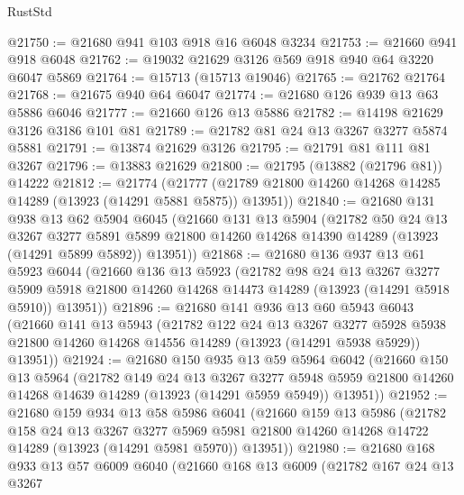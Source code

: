 \begin{lexlean}{RustStd}
\begin{coremodule}
@21750 := @21680 @941 @103 @918 @16 @6048 @3234
@21753 := @21660 @941 @918 @6048
@21762 := @19032 @21629 @3126 @569 @918 @940 @64 @3220 @6047 @5869
@21764 := @15713 (@15713 @19046)
@21765 := @21762 @21764
@21768 := @21675 @940 @64 @6047
@21774 := @21680 @126 @939 @13 @63 @5886 @6046
@21777 := @21660 @126 @13 @5886
@21782 := @14198 @21629 @3126 @3186 @101 @81
@21789 := @21782 @81 @24 @13 @3267 @3277 @5874 @5881
@21791 := @13874 @21629 @3126
@21795 := @21791 @81 @111 @81 @3267
@21796 := @13883 @21629
@21800 := @21795 (@13882 (@21796 @81)) @14222
@21812 := @21774
    (@21777 (@21789 @21800 @14260 @14268 @14285 @14289 (@13923 (@14291 @5881 @5875)) @13951))
@21840 := @21680
    @131
    @938
    @13
    @62
    @5904
    @6045
    (@21660
      @131
      @13
      @5904
      (@21782
        @50
        @24
        @13
        @3267
        @3277
        @5891
        @5899
        @21800
        @14260
        @14268
        @14390
        @14289
        (@13923 (@14291 @5899 @5892))
        @13951))
@21868 := @21680
    @136
    @937
    @13
    @61
    @5923
    @6044
    (@21660
      @136
      @13
      @5923
      (@21782
        @98
        @24
        @13
        @3267
        @3277
        @5909
        @5918
        @21800
        @14260
        @14268
        @14473
        @14289
        (@13923 (@14291 @5918 @5910))
        @13951))
@21896 := @21680
    @141
    @936
    @13
    @60
    @5943
    @6043
    (@21660
      @141
      @13
      @5943
      (@21782
        @122
        @24
        @13
        @3267
        @3277
        @5928
        @5938
        @21800
        @14260
        @14268
        @14556
        @14289
        (@13923 (@14291 @5938 @5929))
        @13951))
@21924 := @21680
    @150
    @935
    @13
    @59
    @5964
    @6042
    (@21660
      @150
      @13
      @5964
      (@21782
        @149
        @24
        @13
        @3267
        @3277
        @5948
        @5959
        @21800
        @14260
        @14268
        @14639
        @14289
        (@13923 (@14291 @5959 @5949))
        @13951))
@21952 := @21680
    @159
    @934
    @13
    @58
    @5986
    @6041
    (@21660
      @159
      @13
      @5986
      (@21782
        @158
        @24
        @13
        @3267
        @3277
        @5969
        @5981
        @21800
        @14260
        @14268
        @14722
        @14289
        (@13923 (@14291 @5981 @5970))
        @13951))
@21980 := @21680
    @168
    @933
    @13
    @57
    @6009
    @6040
    (@21660
      @168
      @13
      @6009
      (@21782
        @167
        @24
        @13
        @3267

\end{coremodule}
\end{lexlean}
